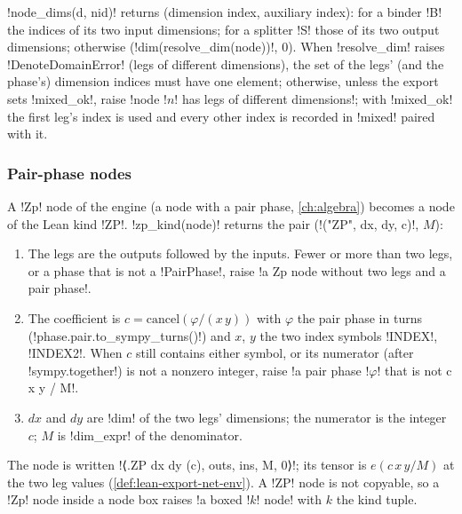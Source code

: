 {\py!node_dims(d, nid)! returns (dimension index, auxiliary index): for a binder \code!B! the
indices of its two input dimensions; for a splitter \code!S! those of its two output dimensions;
otherwise (\py!dim(resolve_dim(node))!, 0). When \py!resolve_dim! raises
\py!DenoteDomainError! (legs of different dimensions), the set of the legs' (and the phase's)
dimension indices must have one element; otherwise, unless the export sets \py!mixed_ok!, raise
\code!node !$n$\code! has legs of different dimensions!; with \py!mixed_ok! the first leg's
index is used and every other index is recorded in \py!mixed! paired with it.

\subsubsection{Pair-phase nodes}\label{sec:lean-export-net-zp}

A \code!Zp! node of the engine (a node with a pair phase, \cref{ch:algebra}) becomes a node of
the Lean kind \lean!ZP!. \py!zp_kind(node)! returns the pair (\py!("ZP", dx, dy, c)!, $M$):
\begin{enumerate}
\item The legs are the outputs followed by the inputs. Fewer or more than two legs, or a phase
  that is not a \py!PairPhase!, raise \code!a Zp node without two legs and a pair phase!.
\item The coefficient is $c = \mathrm{cancel}(\varphi / (x\,y))$ with $\varphi$ the pair phase in
  turns (\py!phase.pair.to_sympy_turns()!) and $x$, $y$ the two index symbols \py!INDEX!,
  \py!INDEX2!. When $c$ still contains either symbol, or its numerator (after
  \py!sympy.together!) is not a nonzero integer, raise
  \code!a pair phase !$\varphi$\code! that is not c x y / M!.
\item $dx$ and $dy$ are \py!dim! of the two legs' dimensions; the numerator is the integer $c$;
  $M$ is \py!dim_expr! of the denominator.
\end{enumerate}
The node is written \code!⟨.ZP dx dy (c), outs, ins, M, 0⟩!; its tensor is $e(c\,x\,y/M)$ at the
two leg values (\cref{def:lean-export-net-env}). A \lean!ZP! node is not copyable, so a
\code!Zp! node inside a node box raises \code!a boxed !$k$\code! node! with $k$ the kind tuple.

}
